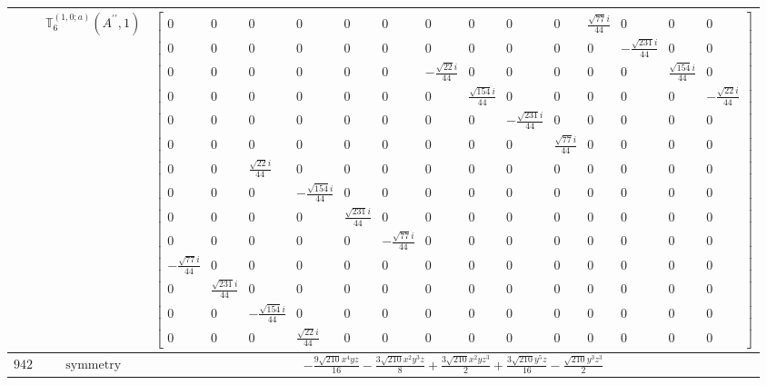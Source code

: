 \documentclass[fleqn,8pt,landscape]{jsarticle}
\begin{document}
\begin{longtable}{ccc}
$  $ & $ \mathbb{T}_{6}^{(1,0;a)}(A^{\prime\prime},1) $ & $ \begin{bmatrix} 0 & 0 & 0 & 0 & 0 & 0 & 0 & 0 & 0 & 0 & \frac{\sqrt{77} i}{44} & 0 & 0 & 0 \\ 0 & 0 & 0 & 0 & 0 & 0 & 0 & 0 & 0 & 0 & 0 & - \frac{\sqrt{231} i}{44} & 0 & 0 \\ 0 & 0 & 0 & 0 & 0 & 0 & - \frac{\sqrt{22} i}{44} & 0 & 0 & 0 & 0 & 0 & \frac{\sqrt{154} i}{44} & 0 \\ 0 & 0 & 0 & 0 & 0 & 0 & 0 & \frac{\sqrt{154} i}{44} & 0 & 0 & 0 & 0 & 0 & - \frac{\sqrt{22} i}{44} \\ 0 & 0 & 0 & 0 & 0 & 0 & 0 & 0 & - \frac{\sqrt{231} i}{44} & 0 & 0 & 0 & 0 & 0 \\ 0 & 0 & 0 & 0 & 0 & 0 & 0 & 0 & 0 & \frac{\sqrt{77} i}{44} & 0 & 0 & 0 & 0 \\ 0 & 0 & \frac{\sqrt{22} i}{44} & 0 & 0 & 0 & 0 & 0 & 0 & 0 & 0 & 0 & 0 & 0 \\ 0 & 0 & 0 & - \frac{\sqrt{154} i}{44} & 0 & 0 & 0 & 0 & 0 & 0 & 0 & 0 & 0 & 0 \\ 0 & 0 & 0 & 0 & \frac{\sqrt{231} i}{44} & 0 & 0 & 0 & 0 & 0 & 0 & 0 & 0 & 0 \\ 0 & 0 & 0 & 0 & 0 & - \frac{\sqrt{77} i}{44} & 0 & 0 & 0 & 0 & 0 & 0 & 0 & 0 \\ - \frac{\sqrt{77} i}{44} & 0 & 0 & 0 & 0 & 0 & 0 & 0 & 0 & 0 & 0 & 0 & 0 & 0 \\ 0 & \frac{\sqrt{231} i}{44} & 0 & 0 & 0 & 0 & 0 & 0 & 0 & 0 & 0 & 0 & 0 & 0 \\ 0 & 0 & - \frac{\sqrt{154} i}{44} & 0 & 0 & 0 & 0 & 0 & 0 & 0 & 0 & 0 & 0 & 0 \\ 0 & 0 & 0 & \frac{\sqrt{22} i}{44} & 0 & 0 & 0 & 0 & 0 & 0 & 0 & 0 & 0 & 0 \end{bmatrix} $ \\ \hline
$ 942 $ & $ \text{symmetry} $ & $ - \frac{9 \sqrt{210} x^{4} y z}{16} - \frac{3 \sqrt{210} x^{2} y^{3} z}{8} + \frac{3 \sqrt{210} x^{2} y z^{3}}{2} + \frac{3 \sqrt{210} y^{5} z}{16} - \frac{\sqrt{210} y^{3} z^{3}}{2} $ \\

\end{longtable}
\end{document}
